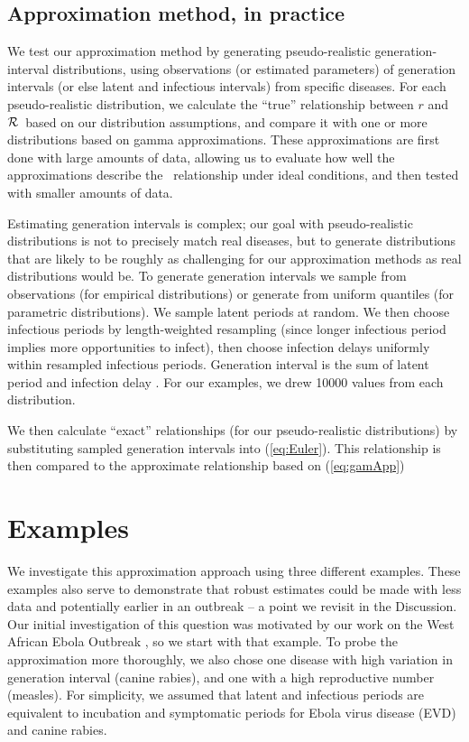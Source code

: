 \documentclass[12pt]{article}
\newcommand{\RR}{\ensuremath{{\cal R}}}
\newcommand{\eref}[1]{(\ref{eq:#1})}
\begin{document}
\subsection{Approximation method, in practice}

We test our approximation method by generating pseudo-realistic generation-interval distributions, using observations (or estimated parameters) of generation intervals (or else latent and infectious intervals) from specific diseases. 
For each pseudo-realistic distribution, we calculate the ``true'' relationship between $r$ and \RR\ based on our distribution assumptions, and compare it with one or more distributions based on gamma approximations. 
These approximations are first done with large amounts of data, allowing us to evaluate how well the approximations describe the \rR\ relationship under ideal conditions, and then tested with smaller amounts of data. 

Estimating generation intervals is complex; our goal with pseudo-realistic distributions is not to precisely match real diseases, but to generate distributions that are likely to be roughly as challenging for our approximation methods as real distributions would be.
To generate generation intervals we sample from observations (for empirical distributions) or generate from uniform quantiles (for parametric distributions). We sample latent periods at random.
We then choose infectious periods by length-weighted resampling (since longer infectious period implies more opportunities to infect), then choose infection delays uniformly within resampled infectious periods. Generation interval is the sum of latent period and infection delay \cite{HampDush09}.  
For our examples, we drew 10000 values from each distribution. 

We then calculate ``exact'' relationships (for our pseudo-realistic distributions) by substituting sampled generation intervals into \eref{Euler}.
This relationship is then compared to the approximate relationship based on \eref{gamApp}

\section{Examples}

We investigate this approximation approach using three different examples. 
These examples also serve to demonstrate that robust estimates could be made with less data and potentially earlier in an outbreak -- a point we revisit in the Discussion.
Our initial investigation of this question was motivated by our work on the West African Ebola Outbreak \cite{WeitDush15}, so we start with that example. To probe the approximation more thoroughly, we also chose one disease with high variation in generation interval (canine rabies), and one with a high reproductive number (measles). For simplicity, we assumed that latent and infectious periods are equivalent to incubation and symptomatic periods for Ebola virus disease (EVD) and canine rabies.
\end{document}
